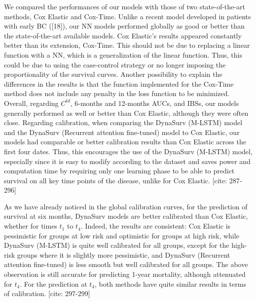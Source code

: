 \documentclass[a4paper,10pt]{article}
\begin{document}
We compared the performances of our models with those of two state-of-the-art methods, Cox Elastic and Cox-Time. Unlike a recent model developed in patients with early BC ([18]), our NN models performed globally as good or better than the state-of-the-art available models. Cox Elastic's results appeared constantly better than its extension, Cox-Time. This should not be due to replacing a linear function with a NN, which is a generalization of the linear function. Thus, this could be due to using the case-control strategy or no longer imposing the proportionality of the survival curves. Another possibility to explain the differences in the results is that the function implemented for the Cox-Time method does not include any penalty in the loss function to be minimized. Overall, regarding $C^{td}$, 6-months and 12-months AUCs, and IBSs, our models generally performed as well or better than Cox Elastic, although they were often close. Regarding calibration, when comparing the DynaSurv (M-LSTM) model and the DynaSurv (Recurrent attention fine-tuned) model to Cox Elastic, our models had comparable or better calibration results than Cox Elastic across the first four dates. Thus, this encourages the use of the DynaSurv (M-LSTM) model, especially since it is easy to modify according to the dataset and saves power and computation time by requiring only one learning phase to be able to predict survival on all key time points of the disease, unlike for Cox Elastic. [cite: 287-296]

As we have already noticed in the global calibration curves, for the prediction of survival at six months, DynaSurv models are better calibrated than Cox Elastic, whether for times $t_1$ to $t_4$. Indeed, the results are consistent: Cox Elastic is pessimistic for groups at low risk and optimistic for groups at high risk, while DynaSurv (M-LSTM) is quite well calibrated for all groups, except for the high-risk groups where it is slightly more pessimistic, and DynaSurv (Recurrent attention fine-tuned) is less smooth but well calibrated for all groups. The above observation is still accurate for predicting 1-year mortality, although attenuated for $t_4$. For the prediction at $t_4$, both methods have quite similar results in terms of calibration. [cite: 297-299]
\end{document}
